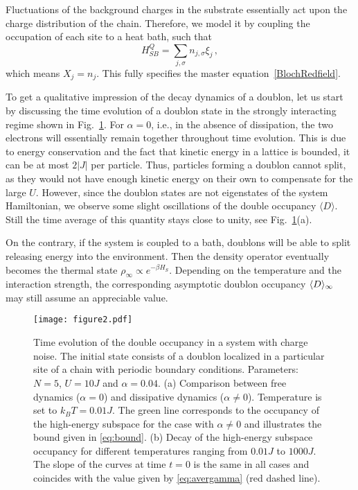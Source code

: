 \documentclass[twocolumn,prb,showpacs]{revtex4-1}
\DeclarePairedDelimiter\mean{\langle}{\rangle}
\begin{document}
Fluctuations of the background charges in the substrate essentially act
upon the charge distribution of the chain. Therefore, we model it by
coupling the occupation of each site to a heat bath, such that
\begin{equation}
H_{SB}^Q = \sum_{j,\sigma} n_{j,\sigma} \xi_j \,,
\end{equation}
which means $X_j = n_j$. This fully specifies the master equation~\eqref{BlochRedfield}.

To get a qualitative impression of the decay dynamics of a doublon, let us
start by discussing the time evolution of a doublon state in the strongly
interacting regime shown in Fig.~\ref{fig:dynamics}.  For $\alpha=0$,
i.e., in the absence of dissipation, the two electrons will essentially
remain together throughout time evolution. This is due to energy
conservation and the fact that kinetic energy in a lattice is bounded, it
can be at most $2|J|$ per particle. Thus, particles forming a doublon
cannot split, as they would not have enough kinetic energy on their own to
compensate for the large $U$.  However, since the doublon states are not
eigenstates of the system Hamiltonian, we observe some slight oscillations
of the double occupancy $\langle D\rangle$.  Still the time average of
this quantity stays close to unity, see Fig.~\ref{fig:dynamics}(a). 

On the contrary, if the system is coupled to a bath, doublons will be able to 
split releasing energy into the environment.  Then the density operator
eventually becomes the thermal state $\rho_\infty\propto e^{-\beta H_S}$.
Depending on the temperature and the interaction strength, the
corresponding asymptotic doublon occupancy $\mean{D}_\infty$ may still
assume an appreciable value.

\begin{figure}
    \centering\texttt{[image: figure2.pdf]}
    \caption{Time evolution of the double occupancy in a system with charge
        noise. The initial state consists of a doublon localized in a 
        particular site of a chain with periodic boundary conditions.  
        Parameters: $N=5$, $U=10J$ and $\alpha=0.04$. (a) Comparison between 
        free dynamics ($\alpha=0$) and dissipative dynamics ($\alpha\neq 0$). 
        Temperature is set to $k_B T=0.01J$. The green line corresponds to the 
        occupancy of the high-energy subspace for the case with $\alpha\neq 0$ 
        and illustrates the bound given in \eqref{eq:bound}. (b) Decay of the 
        high-energy subspace occupancy for different temperatures ranging from  
        $0.01J$ to $1000J$. The slope of the curves at time $t=0$ is the same 
        in all cases and coincides with the value given by \eqref{eq:avergamma} 
        (red dashed line).} 
        \label{fig:dynamics} 
\end{figure} 
\end{document}
